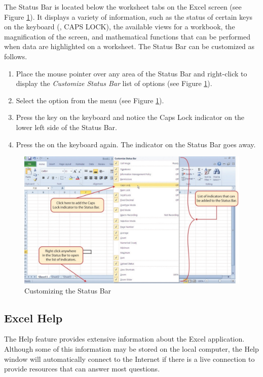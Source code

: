 The Status Bar is located below the worksheet tabs on the Excel screen (see Figure \ref{01:fig13}). It displays a variety of information, such as the status of certain keys on the keyboard (\eg, CAPS LOCK), the available views for a workbook, the magnification of the screen, and mathematical functions that can be performed when data are highlighted on a worksheet. The Status Bar can be customized as follows.

\begin{enumerate}
	\item Place the mouse pointer over any area of the Status Bar and right-click to display the \textit{Customize Status Bar} list of options (see Figure \ref{01:fig13}).
	\item Select the  option from the menu (see Figure \ref{01:fig13}).
	\item Press the  key on the keyboard and notice the Caps Lock indicator on the lower left side of the Status Bar.
	\item Press the  on the keyboard again. The indicator on the Status Bar goes away.
\end{enumerate}

\begin{figure}[H]
	\centering
	\includegraphics[width=\maxwidth{.95\linewidth}]{gfx/ch01_fig13}
	\caption{Customizing the Status Bar}
	\label{01:fig13}
\end{figure}

\subsection{Excel Help}

The Help feature provides extensive information about the Excel application. Although some of this information may be stored on the local computer, the Help window will automatically connect to the Internet if there is a live connection to provide resources that can answer most questions. 


